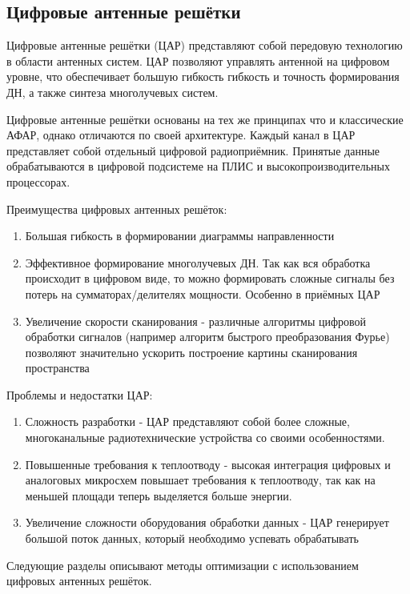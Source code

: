 \subsection{Цифровые антенные решётки}\label{sect:daa}

Цифровые антенные решётки (ЦАР) представляют собой передовую технологию в области антенных систем. ЦАР позволяют 
управлять антенной на цифровом уровне, что обеспечивает большую гибкость гибкость и точность формирования ДН, а также 
синтеза многолучевых систем.

Цифровые антенные решётки основаны на тех же принципах что и классические АФАР, однако отличаются по своей архитектуре. 
Каждый канал в ЦАР представляет собой отдельный цифровой радиоприёмник. Принятые данные обрабатываются в цифровой 
подсистеме на ПЛИС и высокопроизводительных процессорах. 

Преимущества цифровых антенных решёток:

\begin{enumerate}
    \item Большая гибкость в формировании диаграммы направленности
    \item Эффективное формирование многолучевых ДН. Так как вся обработка происходит в цифровом виде, 
    то можно формировать сложные сигналы без потерь на сумматорах/делителях мощности. Особенно в приёмных ЦАР
    \item Увеличение скорости сканирования - различные алгоритмы цифровой обработки сигналов 
    (например алгоритм быстрого преобразования Фурье) позволяют значительно ускорить построение 
    картины сканирования пространства
\end{enumerate}

Проблемы и недостатки ЦАР:

\begin{enumerate}
    \item Сложность разработки - ЦАР представляют собой более сложные, многоканальные радиотехнические устройства 
    со своими особенностями.
    \item Повышенные требования к теплоотводу - высокая интеграция цифровых и аналоговых микросхем повышает 
    требования к теплоотводу, так как на меньшей площади теперь выделяется больше энергии.
    \item Увеличение сложности оборудования обработки данных - ЦАР генерирует большой поток данных, 
    который необходимо успевать обрабатывать
\end{enumerate}

Следующие разделы описывают методы оптимизации с использованием цифровых антенных решёток.